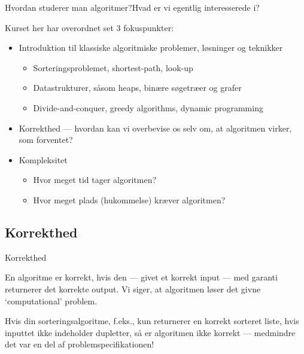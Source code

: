 \documentclass[aspectratio=1610]{beamer}
\begin{document}
\begin{frame}{Hvordan studerer man algoritmer?}{Hvad er vi egentlig
    interesserede i?}

    Kurset her har overordnet set 3 fokuspunkter:

    \pause
    \begin{itemize}
        \item Introduktion til klassiske algoritmiske problemer, løsninger og
            teknikker 
            \begin{itemize}
                \item Sorteringsproblemet, shortest-path, look-up
                \item Datastrukturer, såsom heaps, binære søgetræer og grafer
                \item Divide-and-conquer, greedy algorithms, dynamic programming
            \end{itemize}
        \pause
        \medskip
        \item Korrekthed --- hvordan kan vi overbevise os selv om, at algoritmen
            virker, som forventet?
        \pause
        \medskip
        \item Kompleksitet
            \begin{itemize}
                \item Hvor meget \alert{tid} tager algoritmen?
                \item Hvor meget \alert{plads} (hukommelse) kræver algoritmen?
            \end{itemize}
    \end{itemize}

\end{frame}

\subsection{Korrekthed}

\begin{frame}{Korrekthed}

    \begin{definition}[Korrekthed]
        En algoritme er \alert{korrekt}, hvis den --- givet et korrekt input ---
        med garanti returnerer det korrekte output. Vi siger, at algoritmen
        \alert{løser} det givne `computational' problem.
    \end{definition}

    \pause
    Hvis din sorteringsalgoritme, f.eks., kun returnerer en korrekt sorteret
    liste, hvis inputtet ikke indeholder dupletter, så er algoritmen ikke
    korrekt --- medmindre det var en del af problemspecifikationen!
    
\end{frame}
\end{document}
